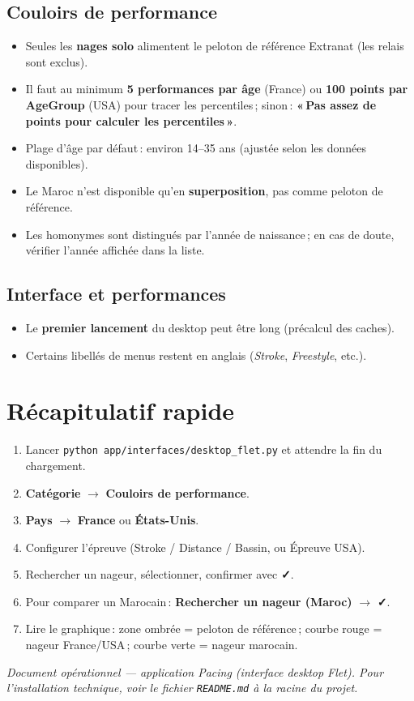 \documentclass[11pt,a4paper]{article}
\newcommand{\checkmark}{\textbf{✓}}
\begin{document}
\subsection{Couloirs de performance}

\begin{itemize}
  \item Seules les \textbf{nages solo} alimentent le peloton de référence Extranat (les relais sont exclus).
  \item Il faut au minimum \textbf{5 performances par âge} (France) ou \textbf{100 points par AgeGroup} (USA) pour tracer les percentiles\,; sinon\,: \textbf{«\,Pas assez de points pour calculer les percentiles\,»}.
  \item Plage d'âge par défaut\,: environ 14--35 ans (ajustée selon les données disponibles).
  \item Le Maroc n'est disponible qu'en \textbf{superposition}, pas comme peloton de référence.
  \item Les homonymes sont distingués par l'année de naissance\,; en cas de doute, vérifier l'année affichée dans la liste.
\end{itemize}

\subsection{Interface et performances}

\begin{itemize}
  \item Le \textbf{premier lancement} du desktop peut être long (précalcul des caches).
  \item Certains libellés de menus restent en anglais (\emph{Stroke}, \emph{Freestyle}, etc.).
\end{itemize}

\section{Récapitulatif rapide}

\begin{enumerate}
  \item Lancer \texttt{python app/interfaces/desktop_flet.py} et attendre la fin du chargement.
  \item \textbf{Catégorie} $\rightarrow$ \textbf{Couloirs de performance}.
  \item \textbf{Pays} $\rightarrow$ \textbf{France} ou \textbf{États-Unis}.
  \item Configurer l'épreuve (Stroke / Distance / Bassin, ou Épreuve USA).
  \item Rechercher un nageur, sélectionner, confirmer avec \checkmark{}.
  \item Pour comparer un Marocain\,: \textbf{Rechercher un nageur (Maroc)} $\rightarrow$ \checkmark{}.
  \item Lire le graphique\,: zone ombrée = peloton de référence\,; courbe rouge = nageur France/USA\,; courbe verte = nageur marocain.
\end{enumerate}

\vspace{0.5em}
\noindent\textit{Document opérationnel --- application Pacing (interface desktop Flet). Pour l'installation technique, voir le fichier \texttt{README.md} à la racine du projet.}
\end{document}
